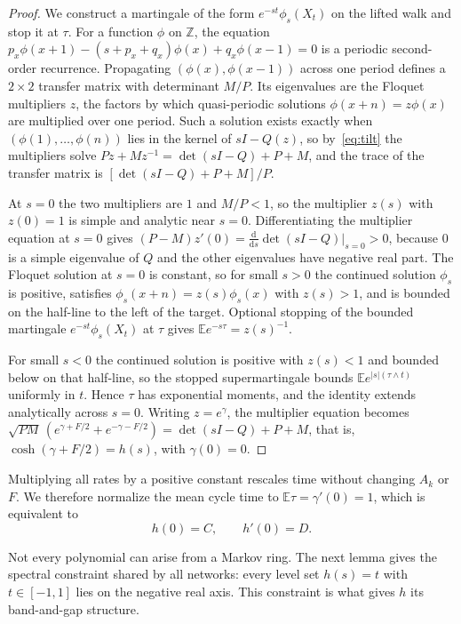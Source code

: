 \documentclass[11pt]{article}
\theoremstyle{remark}
\newcommand{\E}{\mathbb E}
\newcommand{\dd}{\mathrm d}
\begin{document}
\begin{proof}
We construct a martingale of the form $e^{-st}\phi_s(X_t)$ on the lifted
walk and stop it at $\tau$. For a function $\phi$ on $\mathbb Z$, the
equation $p_x\phi(x+1)-(s+p_x+q_x)\phi(x)+q_x\phi(x-1)=0$ is a periodic
second-order recurrence. Propagating $(\phi(x),\phi(x-1))$ across one
period defines a $2\times2$ transfer matrix with determinant $M/P$. Its
eigenvalues are the Floquet multipliers $z$, the factors by which
quasi-periodic solutions $\phi(x+n)=z\phi(x)$ are multiplied over one
period. Such a solution exists exactly when $(\phi(1),\dots,\phi(n))$ lies
in the kernel of $sI-Q(z)$, so by~\eqref{eq:tilt} the multipliers solve
$Pz+Mz^{-1}=\det(sI-Q)+P+M$, and the trace of the transfer matrix is
$[\det(sI-Q)+P+M]/P$.

At $s=0$ the two multipliers are $1$ and $M/P<1$, so the multiplier $z(s)$
with $z(0)=1$ is simple and analytic near $s=0$. Differentiating the
multiplier equation at $s=0$ gives
$(P-M)z'(0)=\frac{\dd}{\dd s}\det(sI-Q)\big|_{s=0}>0$, because $0$ is a simple
eigenvalue of $Q$ and the other eigenvalues have negative real part. The
Floquet solution at $s=0$ is constant, so for small $s>0$ the continued
solution $\phi_s$ is positive, satisfies
$\phi_s(x+n)=z(s)\phi_s(x)$ with $z(s)>1$, and is bounded on the half-line
to the left of the target. Optional stopping of the bounded martingale
$e^{-st}\phi_s(X_t)$ at $\tau$ gives $\E e^{-s\tau}=z(s)^{-1}$.

For small $s<0$ the continued solution is positive with $z(s)<1$ and
bounded below on that half-line, so the stopped supermartingale bounds
$\E e^{|s|(\tau\wedge t)}$ uniformly in $t$. Hence $\tau$ has exponential
moments, and the identity extends analytically across $s=0$. Writing
$z=e^{\gamma}$, the multiplier equation becomes
$\sqrt{PM}\,(e^{\gamma+F/2}+e^{-\gamma-F/2})=\det(sI-Q)+P+M$, that is,
$\cosh(\gamma+F/2)=h(s)$, with $\gamma(0)=0$.
\end{proof}

Multiplying all rates by a positive constant rescales time without changing
$A_k$ or $F$. We therefore normalize the mean cycle time to
$\E\tau=\gamma'(0)=1$, which is equivalent to
\begin{equation}\label{eq:normal}
h(0)=C,\qquad h'(0)=D.
\end{equation}

Not every polynomial can arise from a Markov ring. The next lemma gives the
spectral constraint shared by all networks: every level set $h(s)=t$ with
$t\in[-1,1]$ lies on the negative real axis. This constraint is what gives
$h$ its band-and-gap structure.
\end{document}
